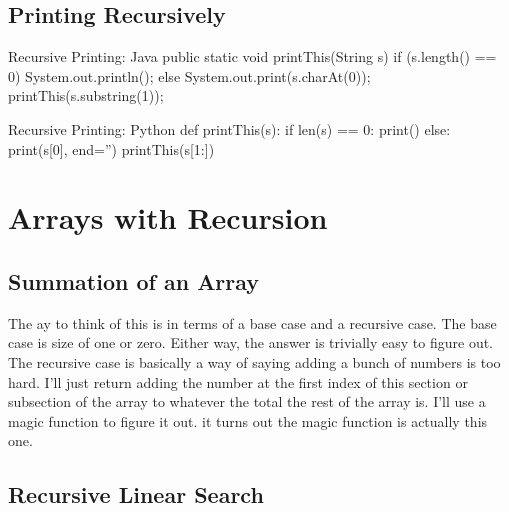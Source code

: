 \subsection{Printing Recursively}

\begin{javacode}{Recursive Printing: Java}
public static void printThis(String s){
	if (s.length() == 0) {
		System.out.println();
	} else {
		System.out.print(s.charAt(0));
		printThis(s.substring(1));
	}
}
\end{javacode}

\begin{pycode}{Recursive Printing: Python}
def printThis(s):
	if len(s) == 0:
		print()
	else:
		print(s[0], end='')
		printThis(s[1:])
\end{pycode}


\section{Arrays with Recursion}


\subsection{Summation of an Array}
%
%


The ay to think of this is in terms of a base case and a recursive case.  The base case is size of one or zero.  Either way, the answer is trivially easy to figure out.  The recursive case is basically a way of saying adding a bunch of numbers is too hard.  I'll just return adding the number at the first index of this section or subsection of the array to whatever the total the rest of the array is.  I'll use a magic function to figure it out.  it turns out the magic function is actually this one.


\subsection{Recursive Linear Search}

